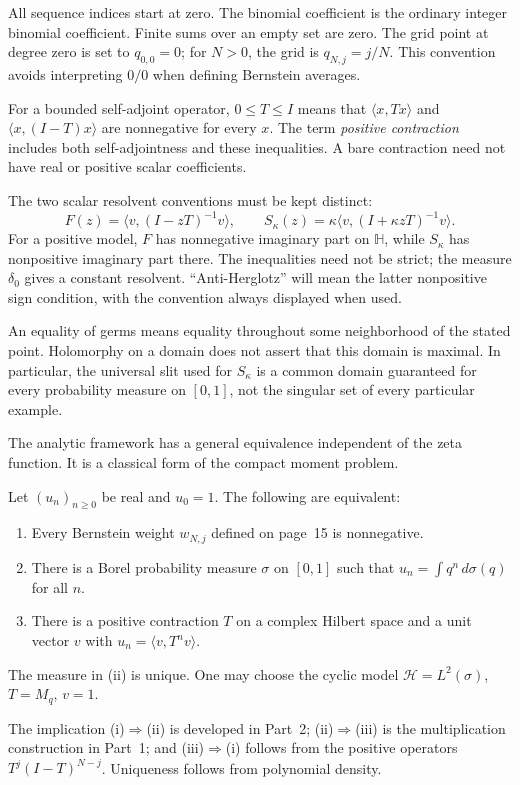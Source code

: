 \medskip
All sequence indices start at zero. The binomial coefficient is the
ordinary integer binomial coefficient. Finite sums over an empty set
are zero. The grid point at degree zero is set to $q_{0,0}=0$; for
$N>0$, the grid is $q_{N,j}=j/N$. This convention avoids interpreting
$0/0$ when defining Bernstein averages.

For a bounded self-adjoint operator, $0\le T\le I$ means that
$\langle x,Tx\rangle$ and $\langle x,(I-T)x\rangle$ are nonnegative
for every $x$. The term \emph{positive contraction} includes both
self-adjointness and these inequalities. A bare contraction need not
have real or positive scalar coefficients.

The two scalar resolvent conventions must be kept distinct:
\[
 F(z)=\langle v,(I-zT)^{-1}v\rangle,\qquad
 S_\kappa(z)=\kappa\langle v,(I+\kappa zT)^{-1}v\rangle.
\]
For a positive model, $F$ has nonnegative imaginary part on
$\mathbb H$, while $S_\kappa$ has nonpositive imaginary part there.
The inequalities need not be strict; the measure $\delta_0$ gives a
constant resolvent. ``Anti-Herglotz'' will mean the latter nonpositive
sign condition, with the convention always displayed when used.

An equality of germs means equality throughout some neighborhood of
the stated point. Holomorphy on a domain does not assert that this
domain is maximal. In particular, the universal slit used for
$S_\kappa$ is a common domain guaranteed for every probability measure
on $[0,1]$, not the singular set of every particular example.

The analytic framework has a general equivalence independent of the
zeta function. It is a classical form of the compact moment problem.
\begin{theorem}\label{intro:correspondence}
Let $(u_n)_{n\ge0}$ be real and $u_0=1$. The following are equivalent:
\begin{enumerate}[label=(\roman*)]
\item Every Bernstein weight $w_{N,j}$ defined on page~15 is nonnegative.
\item There is a Borel probability measure $\sigma$ on $[0,1]$ such that
$u_n=\int q^n\,d\sigma(q)$ for all $n$.
\item There is a positive contraction $T$ on a complex Hilbert space
and a unit vector $v$ with $u_n=\langle v,T^nv\rangle$.
\end{enumerate}
The measure in (ii) is unique. One may choose the cyclic model
$\mathcal H=L^2(\sigma)$, $T=M_q$, $v=1$.
\end{theorem}
The implication (i)$\Rightarrow$(ii) is developed in Part~2;
(ii)$\Rightarrow$(iii) is the multiplication construction in Part~1;
and (iii)$\Rightarrow$(i) follows from the positive operators
$T^j(I-T)^{N-j}$. Uniqueness follows from polynomial density.

